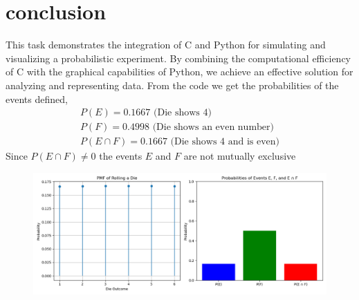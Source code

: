 \documentclass[journal]{IEEEtran}
\begin{document}
 \section*{conclusion}
This task demonstrates the integration of C and Python for simulating and visualizing a probabilistic experiment. By combining the computational efficiency of C with the graphical capabilities of Python, we achieve an effective solution for analyzing and representing data.
From the code we get the probabilities of the events defined, 
\begin{align}
P(E) = 0.1667 \text{ (Die shows 4)} \\
P(F) = 0.4998 \text{ (Die shows an even number)} \\
P(E \cap F) = 0.1667 \text{ (Die shows 4 and is even)} 
\end{align}
Since $P(E \cap F) \neq 0$ the events $E$ and $F$ are not mutually exclusive
\begin{figure}[h!]
   \centering
   \includegraphics[width=\columnwidth]{figs/fig.png}
\end{figure}
\end{document}

